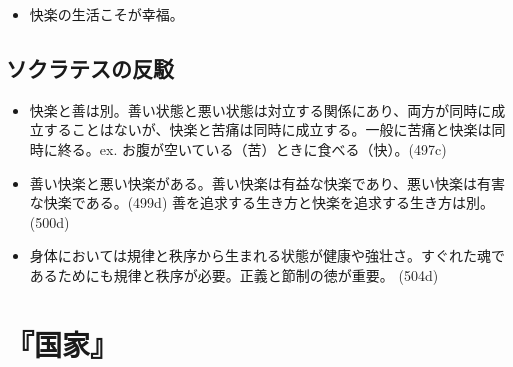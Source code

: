 \documentclass[dvipdfmx]{bxjsarticle}
\begin{document}
\begin{itemize}
\item 快楽の生活こそが幸福。
\end{itemize}

\subsection{ソクラテスの反駁}

\begin{itemize}
\item 快楽と善は別。善い状態と悪い状態は対立する関係にあり、両方が同時に成立することはないが、快楽と苦痛は同時に成立する。一般に苦痛と快楽は同時に終る。ex. お腹が空いている（苦）ときに食べる（快）。(497c)

\item 善い快楽と悪い快楽がある。善い快楽は有益な快楽であり、悪い快楽は有害な快楽である。(499d) 善を追求する生き方と快楽を追求する生き方は別。(500d)
\item 身体においては規律と秩序から生まれる状態が健康や強壮さ。すぐれた魂であるためにも規律と秩序が必要。正義と節制の徳が重要。 (504d)

\end{itemize}


\section{『国家』}
\end{document}
